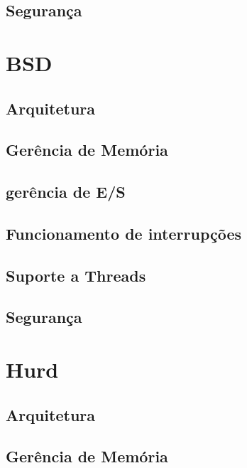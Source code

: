 \documentclass[conference]{IEEEtran}
\begin{document}
\subsection{Segurança}\label{sec:LinuxSec}

\section{BSD}\label{sec:BSD}

\subsection{Arquitetura}\label{sec:BSDArq}

\subsection{Gerência de Memória}\label{sec:BSDMem}

\subsection{gerência de E/S}\label{sec:BSDES}

\subsection{Funcionamento de interrupções}\label{sec:BSDInt}

\subsection{Suporte a Threads}\label{sec:BSDThreads}

\subsection{Segurança}\label{sec:BSDSec}

\section{Hurd}\label{sec:Hurd}

\subsection{Arquitetura}\label{sec:HurdArq}

\subsection{Gerência de Memória}\label{sec:HurdMem}
\end{document}
